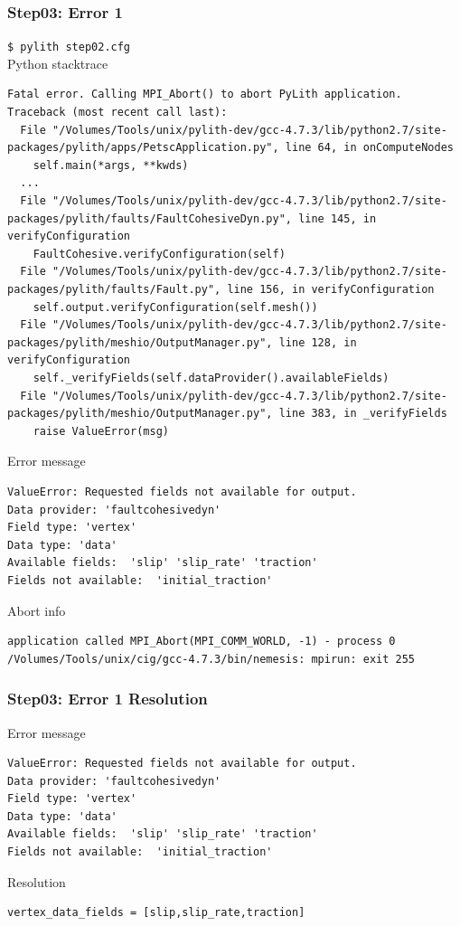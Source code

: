 \documentclass{beamer}
\newcommand{\cmd}[1]{{\tiny\tt \color{ltred}#1}}
\newcommand{\errlabel}[1]{{\small \color{blue}#1}}
\begin{document}
\begin{frame}[fragile]
  \frametitle{Step03: Error 1}

\cmd{\$ pylith step02.cfg}\\
\errlabel{Python stacktrace}
\begin{lstlisting}
Fatal error. Calling MPI_Abort() to abort PyLith application.
Traceback (most recent call last):
  File "/Volumes/Tools/unix/pylith-dev/gcc-4.7.3/lib/python2.7/site-packages/pylith/apps/PetscApplication.py", line 64, in onComputeNodes
    self.main(*args, **kwds)
  ...
  File "/Volumes/Tools/unix/pylith-dev/gcc-4.7.3/lib/python2.7/site-packages/pylith/faults/FaultCohesiveDyn.py", line 145, in verifyConfiguration
    FaultCohesive.verifyConfiguration(self)
  File "/Volumes/Tools/unix/pylith-dev/gcc-4.7.3/lib/python2.7/site-packages/pylith/faults/Fault.py", line 156, in verifyConfiguration
    self.output.verifyConfiguration(self.mesh())
  File "/Volumes/Tools/unix/pylith-dev/gcc-4.7.3/lib/python2.7/site-packages/pylith/meshio/OutputManager.py", line 128, in verifyConfiguration
    self._verifyFields(self.dataProvider().availableFields)
  File "/Volumes/Tools/unix/pylith-dev/gcc-4.7.3/lib/python2.7/site-packages/pylith/meshio/OutputManager.py", line 383, in _verifyFields
    raise ValueError(msg)
\end{lstlisting}
\errlabel{Error message}
\begin{lstlisting}
ValueError: Requested fields not available for output.
Data provider: 'faultcohesivedyn'
Field type: 'vertex'
Data type: 'data'
Available fields:  'slip' 'slip_rate' 'traction'
Fields not available:  'initial_traction'
\end{lstlisting}
\errlabel{Abort info}
\begin{lstlisting}
application called MPI_Abort(MPI_COMM_WORLD, -1) - process 0
/Volumes/Tools/unix/cig/gcc-4.7.3/bin/nemesis: mpirun: exit 255
\end{lstlisting}

\end{frame}


\begin{frame}[fragile]
  \frametitle{Step03: Error 1 Resolution}

\errlabel{Error message}
\begin{lstlisting}
ValueError: Requested fields not available for output.
Data provider: 'faultcohesivedyn'
Field type: 'vertex'
Data type: 'data'
Available fields:  'slip' 'slip_rate' 'traction'
Fields not available:  'initial_traction'
\end{lstlisting}\pause
\errlabel{Resolution}
\begin{lstlisting}
vertex_data_fields = [slip,slip_rate,traction]
\end{lstlisting}

\end{frame}
\end{document}
